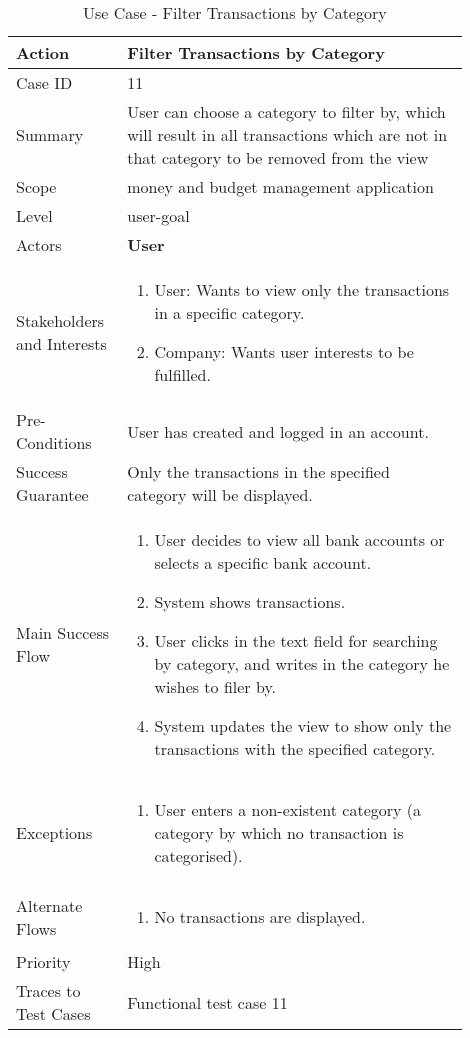 \documentclass[11pt]{article}
\newcounter{use case ID}
\newcommand\tabularhead[1]{
    \begin{table}[ht]
        \addtocounter{use case ID}{1}
        \caption{Use Case \arabic{use case ID} - #1}
        \vspace{0.2cm}
        \begin{tabular}{|p{0.2\linewidth}|p{0.70\linewidth}|}
            \hline
            \textbf{Action} & \textbf{#1} \\
            \hline}
\newcommand\addrow[2]{#1 & #2\\ \hline}
\newcommand\addmulrow[2]{ \begin{minipage}[t][][t]{2.5cm}#1\end{minipage}
                &\begin{minipage}[t][][t]{11cm}
                    \begin{enumerate}[itemsep=-1ex] #2   \end{enumerate}
                \end{minipage}\vfill\\ \hline}
\newenvironment{usecase}{\tabularhead}
        {\hline\end{tabular}\end{table}}
\begin{document}
\begin{usecase}{Filter Transactions by Category}
    \addrow{Case ID}{11}
    \addrow{Summary}{User can choose a category to filter by, which will result in all transactions which are not in that category to be removed from the view}
    \addrow{Scope}{money and budget management application}
    \addrow{Level}{user-goal}
    \addrow{Actors}{\textbf{User}}
    \addmulrow{Stakeholders and Interests}{
     \item User: Wants to view only the transactions in a specific category.
     \item Company: Wants user interests to be fulfilled.}
    \addrow{Pre-Conditions}{User has created and logged in an account.}
    \addrow{Success Guarantee}{Only the transactions in the specified category will be displayed.}
    \addmulrow{Main Success Flow}{
      \item User decides to view all bank accounts or selects a specific bank account.
      \item System shows transactions.
      \item User clicks in the text field for searching by category, and writes in the category he wishes to filer by.
      \item System updates the view to show only the transactions with the specified category.
    }
    \addmulrow{Exceptions}{
    \item User enters a non-existent category (a category by which no transaction is categorised).
    }
    \addmulrow{Alternate Flows}{
    \item No transactions are displayed.}
    \addrow{Priority}{High}
    \addrow{Traces to Test Cases}{Functional test case 11}
\end{usecase}
\end{document}
